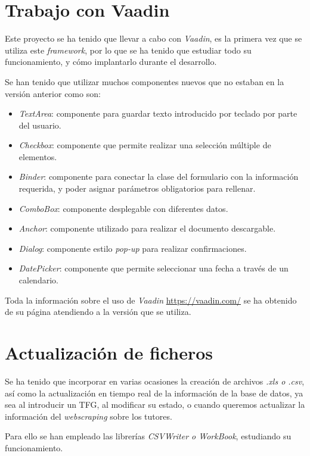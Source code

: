 \section{Trabajo con Vaadin}

Este proyecto se ha tenido que llevar a cabo con \emph{Vaadin}, es la primera vez que se utiliza este \emph{framework}, por lo que se ha tenido que estudiar todo su funcionamiento, y cómo implantarlo durante el desarrollo.

Se han tenido que utilizar muchos componentes nuevos que no estaban en la versión anterior como son:

\begin{itemize}
	\item \emph{TextArea}: componente para guardar texto introducido por teclado por parte del usuario.
	\item \emph{Checkbox}: componente que permite realizar una selección múltiple de elementos.
	\item \emph{Binder}: componente para conectar la clase del formulario con la información requerida, y poder asignar parámetros obligatorios para rellenar.
	\item \emph{ComboBox}: componente desplegable con diferentes datos.
	\item \emph{Anchor}: componente utilizado para realizar el documento descargable.
	\item \emph{Dialog}: componente estilo \emph{pop-up} para realizar confirmaciones.
	\item \emph{DatePicker}: componente que permite seleccionar una fecha a través de un calendario.

\end{itemize}

Toda la información sobre el uso de \emph{Vaadin} \url{https://vaadin.com/} se ha obtenido de su página atendiendo a la versión que se utiliza.

\section{Actualización de ficheros}

Se ha tenido que incorporar en varias ocasiones la creación de archivos \emph{.xls o .csv}, así como la actualización en tiempo real de la información de la base de datos, ya sea al introducir un TFG, al modificar su estado, o cuando queremos actualizar la información del \emph{webscraping} sobre los tutores.

Para ello se han empleado las librerías \emph{CSVWriter o WorkBook}, estudiando su funcionamiento.


